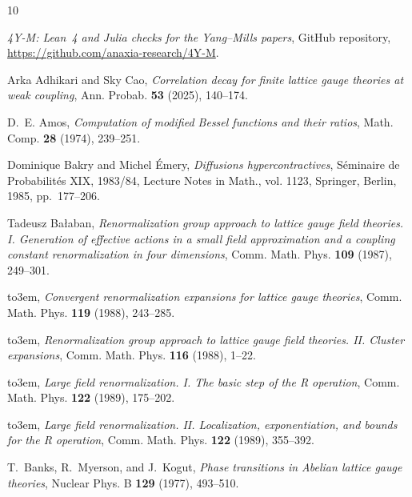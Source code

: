 \documentclass[11pt,a4paper]{amsart}
\theoremstyle{definition}
\theoremstyle{remark}
\numberwithin{equation}{section}
\begin{document}
\providecommand{\bysame}{\leavevmode\hbox to3em{\hrulefill}\thinspace}
\providecommand{\MR}{\relax\ifhmode\unskip\space\fi MR }
\providecommand{\MRhref}[2]{%
  \href{http://www.ams.org/mathscinet-getitem?mr=#1}{#2}
}
\providecommand{\href}[2]{#2}
\begin{thebibliography}{10}

\emph{4{Y}-{M}: {L}ean~4 and {J}ulia checks for the {Y}ang--{M}ills papers},
  GitHub repository, \url{https://github.com/anaxia-research/4Y-M}.

Arka Adhikari and Sky Cao, \emph{Correlation decay for finite lattice gauge
  theories at weak coupling}, Ann. Probab. \textbf{53} (2025), 140--174.

D.~E. Amos, \emph{Computation of modified {B}essel functions and their ratios},
  Math. Comp. \textbf{28} (1974), 239--251.

Dominique Bakry and Michel {\'E}mery, \emph{Diffusions hypercontractives},
  S{\'e}minaire de Probabilit{\'e}s {XIX}, 1983/84, Lecture Notes in Math.,
  vol. 1123, Springer, Berlin, 1985, pp.~177--206.

Tadeusz Ba{\l}aban, \emph{Renormalization group approach to lattice gauge field
  theories. {I}. {G}eneration of effective actions in a small field
  approximation and a coupling constant renormalization in four dimensions},
  Comm. Math. Phys. \textbf{109} (1987), 249--301.

\bysame, \emph{Convergent renormalization expansions for lattice gauge
  theories}, Comm. Math. Phys. \textbf{119} (1988), 243--285.

\bysame, \emph{Renormalization group approach to lattice gauge field theories.
  {II}. {C}luster expansions}, Comm. Math. Phys. \textbf{116} (1988), 1--22.

\bysame, \emph{Large field renormalization. {I}. {T}he basic step of the {R}
  operation}, Comm. Math. Phys. \textbf{122} (1989), 175--202.

\bysame, \emph{Large field renormalization. {II}. {L}ocalization,
  exponentiation, and bounds for the {R} operation}, Comm. Math. Phys.
  \textbf{122} (1989), 355--392.

T.~Banks, R.~Myerson, and J.~Kogut, \emph{Phase transitions in {A}belian
  lattice gauge theories}, Nuclear Phys. B \textbf{129} (1977), 493--510.


\end{thebibliography}
\end{document}
